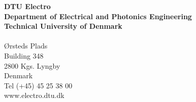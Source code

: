 \thispagestyle{empty} %
\frieze
\vspace*{\fill}
\noindent
\sffamily
\small
\textbf{DTU Electro}\\
\textbf{Department of Electrical and Photonics Engineering}\\
\textbf{Technical University of Denmark}\\
\\
Ørsteds Plads \\
Building 348 \\
2800 Kgs. Lyngby \\
Denmark \\
Tel (+45) 45 25 38 00 \\
www.electro.dtu.dk \\
\normalsize
\normalfont
\vspace*{2.5cm}
